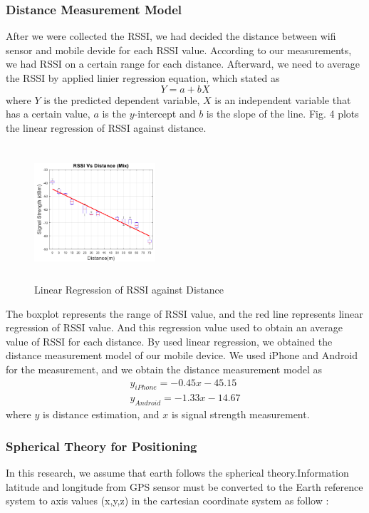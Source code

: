 \documentclass[twocolumn,10pt]{asme2ej}
\begin{document}
	\subsubsection{Distance Measurement Model}
	After we were collected the RSSI, we had decided the distance between wifi sensor and mobile devide for each RSSI value. According to our measurements, we had RSSI on a certain range for each distance. Afterward, we need to average the RSSI by applied linier regression equation, which stated as 
	\begin{equation}
	Y = a + bX
	\end{equation}
	where $Y$ is the predicted dependent variable, $X$ is an independent variable that has a certain value, $a$ is the $y$-intercept and $b$ is the slope of the line. Fig. 4 plots the linear regression of RSSI against distance.
	\begin{figure}[t]
		\begin{center}
			\setlength{\unitlength}{0.012500in}%
			\includegraphics[width=0.4\textwidth,height=50mm]{Fig4_RegLin.png}
		\end{center}
		\caption{Linear Regression of RSSI against Distance}
		\label{Linear} 
	\end{figure}
	The boxplot represents the range of RSSI value, and the red line represents linear regression of RSSI value. And this regression value used to obtain an average value of RSSI for each distance. By used linear regression, we obtained the distance measurement model of our mobile device. We used iPhone and Android for the measurement, and we obtain the distance measurement model as
	\begin{eqnarray}
	y_{iPhone} = -0.45x - 45.15 \\
	y_{Android} = -1.33x - 14.67
	\end{eqnarray}
	where $y$ is distance estimation, and $x$ is signal strength measurement.
	
	\subsubsection{Spherical Theory for Positioning}
	In this research, we assume that earth follows the spherical theory.Information latitude and longitude from GPS sensor must be converted to the Earth reference system to axis values (x,y,z) in the cartesian coordinate system as follow \cite{Song}:
	
\end{document}
